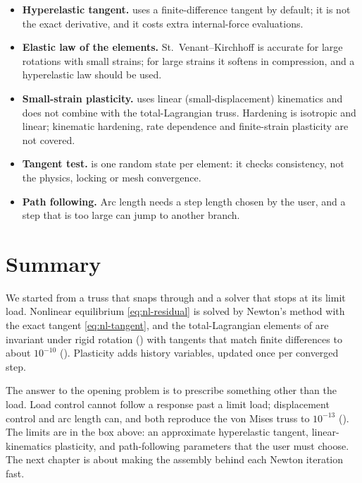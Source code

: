 \begin{limitsbox}
\begin{itemize}
\item \textbf{Hyperelastic tangent.}  uses a finite-difference tangent by default; it is not the exact derivative, and it costs extra internal-force evaluations.
\item \textbf{Elastic law of the  elements.} St.~Venant--Kirchhoff is accurate for large rotations with small strains; for large strains it softens in compression, and a hyperelastic law should be used.
\item \textbf{Small-strain plasticity.}  uses linear (small-displacement) kinematics and does not combine with the total-Lagrangian truss. Hardening is isotropic and linear; kinematic hardening, rate dependence and finite-strain plasticity are not covered.
\item \textbf{Tangent test.}  is one random state per element: it checks consistency, not the physics, locking or mesh convergence.
\item \textbf{Path following.} Arc length needs a step length chosen by the user, and a step that is too large can jump to another branch.
\end{itemize}
\end{limitsbox}

\section{Summary}\label{sec:nl-summary}

We started from a truss that snaps through and a solver that stops at its limit load. Nonlinear equilibrium \eqref{eq:nl-residual} is solved by Newton's method with the exact tangent \eqref{eq:nl-tangent}, and the total-Lagrangian elements of \fea{} are invariant under rigid rotation () with tangents that match finite differences to about $10^{-10}$ (). Plasticity adds history variables, updated once per converged step.

The answer to the opening problem is to prescribe something other than the load. Load control cannot follow a response past a limit load; displacement control and arc length can, and both reproduce the von Mises truss to $10^{-13}$ (). The limits are in the box above: an approximate hyperelastic tangent, linear-kinematics plasticity, and path-following parameters that the user must choose. The next chapter is about making the assembly behind each Newton iteration fast.

